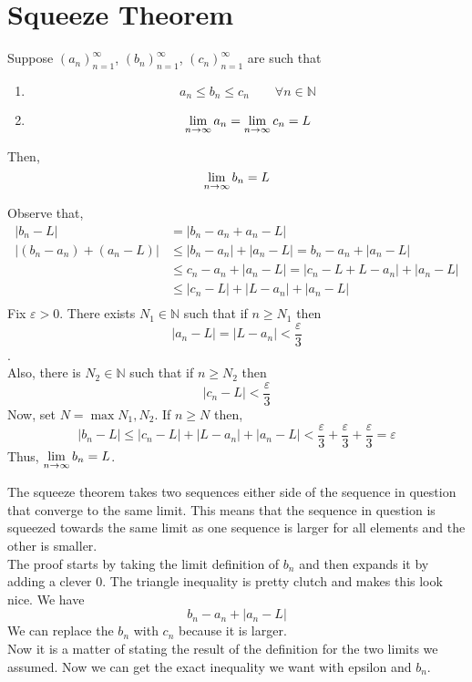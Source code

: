 \documentclass[12pt]{article}
\begin{document}
\maketitle
\newpage
\tableofcontents
\newpage
\section{Squeeze Theorem}
\begin{theo}{}
    Suppose \(\left(a_n\right)^\infty _{n=1}\), \(\left(b_n\right)^\infty _{n=1}\), \(\left(c_n\right)^\infty _{n=1}\) are such that
    \begin{enumerate}
        \item \[a_n \leq b_n \leq c_n \qquad \forall n \in \mathbb{N}\]

        \item \[\displaystyle\lim_{n\to\infty} a_n = \displaystyle\lim_{n\to\infty} c_n = L\]
    \end{enumerate}
    Then,
    \[\displaystyle\lim_{n\to\infty} b_n = L\]
\end{theo}
\begin{prf}{}
    Observe that,  
\begin{align*}
|b_n - L| &= |b_n - a_n + a_n - L|\\
|(b_n - a_n) + (a_n - L)| &\le |b_n - a_n| + |a_n - L| = b_n - a_n + |a_n - L|\\
&\le c_n - a_n + |a_n - L| = |c_n - L + L - a_n| + |a_n - L|\\
&\le |c_n - L| + |L - a_n| + |a_n - L|\\
\end{align*}
Fix $\varepsilon > 0$. There exists $N_1 \in \mathbb N$ such that if $n \ge N_1$ then $$|a_n - L| = |L - a_n| < \frac{\varepsilon}{3}$$.\\
Also, there is $N_2 \in \mathbb N$ such that if $n \ge N_2$ then $$|c_n - L| < \frac{\varepsilon}{3}$$
Now, set $N = \max{N_1, N_2}.$ If $n \ge N$ then, $$|b_n - L| \le |c_n - L| + |L - a_n| + |a_n - L| < \frac{\varepsilon}{3} + \frac{\varepsilon}{3} + \frac{\varepsilon}{3} = \varepsilon$$ Thus, $\displaystyle\lim_{n\to\infty}{b_n} = L$. \\
\end{prf}
\newpage
\begin{explanation}{}
    The squeeze theorem takes two sequences either side of the sequence in question that converge to the same limit. This means that the sequence in question is squeezed towards the same limit as one sequence is larger for all elements and the other is smaller.\\    
    The proof starts by taking the limit definition of \(b_n\) and then expands it by adding a clever 0. The triangle inequality is pretty clutch and makes this look nice. We have \[b_n - a_n + |a_n - L|\]
    We can replace the \(b_n\) with \(c_n\) because it is larger.\\
    Now it is a matter of stating the result of the definition for the two limits we assumed. Now we can get the exact inequality we want with epsilon and \(b_n\).
\end{explanation}
\end{document}
